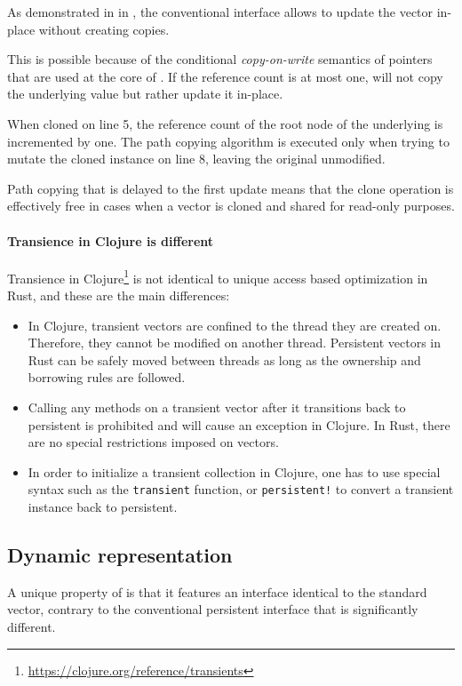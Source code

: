 As demonstrated in  in , the conventional interface allows to update the vector in-place without creating copies.

This is possible because of the conditional \emph{copy-on-write} semantics of \rc{} pointers that are used at the core of \rrbtree{}. If the reference count is at most one,  will not copy the underlying value but rather update it in-place.

When cloned on line 5, the reference count of the root node of the underlying \rrbtree{} is incremented by one. The path copying algorithm is executed only when trying to mutate the cloned instance on line 8, leaving the original  unmodified.

Path copying that is delayed to the first update means that the clone operation is effectively free in cases when a vector is cloned and shared for read-only purposes.

\paragraph{Transience in Clojure is different}
Transience in Clojure\footnote{\url{https://clojure.org/reference/transients}} is not identical to unique access based optimization in Rust, and these are the main differences:

\begin{itemize}
    \item In Clojure, transient vectors are confined to the thread they are created on. Therefore, they cannot be modified on another thread. Persistent vectors in Rust can be safely moved between threads as long as the ownership and borrowing rules are followed.
    \item Calling any methods on a transient vector after it transitions back to persistent is prohibited and will cause an exception in Clojure. In Rust, there are no special restrictions imposed on vectors.
    \item In order to initialize a transient collection in Clojure, one has to use special syntax such as the \texttt{transient} function, or \texttt{persistent!} to convert a transient instance back to persistent.
\end{itemize}

\subsection{Dynamic representation}
A unique property of \pvec{} is that it features an interface identical to the standard vector, contrary to the conventional persistent interface that is significantly different.

